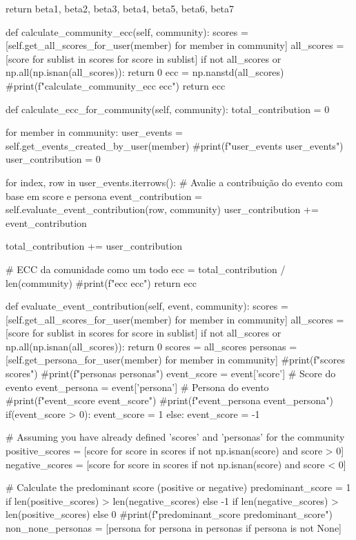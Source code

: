 \begin{codigo}[caption={Exemplo de classe Python para deteção de câmaras de eco}, label={codigo:echochamberdetector}, language=Python, breaklines=true]
        return beta1, beta2, beta3, beta4, beta5, beta6, beta7

    def calculate_community_ecc(self, community):
        scores = [self.get_all_scores_for_user(member) for member in community]
        all_scores = [score for sublist in scores for score in sublist]
        if not all_scores or np.all(np.isnan(all_scores)):
            return 0
        ecc = np.nanstd(all_scores)
        #print(f"calculate_community_ecc {ecc}")
        return ecc

    def calculate_ecc_for_community(self, community):
        total_contribution = 0

        for member in community:
            user_events = self.get_events_created_by_user(member)
            #print(f"user_events {user_events}")
            user_contribution = 0

            for index, row in user_events.iterrows():
                # Avalie a contribuição do evento com base em score e persona
                event_contribution = self.evaluate_event_contribution(row, community)
                user_contribution += event_contribution

            total_contribution += user_contribution

        # ECC da comunidade como um todo
        ecc = total_contribution / len(community)
        #print(f"ecc {ecc}")
        return ecc

    def evaluate_event_contribution(self, event, community):
        scores = [self.get_all_scores_for_user(member) for member in community]
        all_scores = [score for sublist in scores for score in sublist]
        if not all_scores or np.all(np.isnan(all_scores)):
            return 0
        scores = all_scores
        personas = [self.get_persona_for_user(member) for member in community]
        #print(f"scores {scores}")
        #print(f"personas {personas}")
        event_score = event['score']  # Score do evento
        event_persona = event['persona']  # Persona do evento
        #print(f"event_score {event_score}")
        #print(f"event_persona {event_persona}")
        if(event_score > 0): event_score = 1
        else: event_score = -1

        # Assuming you have already defined 'scores' and 'personas' for the community
        positive_scores = [score for score in scores if not np.isnan(score) and score > 0]
        negative_scores = [score for score in scores if not np.isnan(score) and score < 0]

        # Calculate the predominant score (positive or negative)
        predominant_score = 1 if len(positive_scores) > len(negative_scores) else -1 if len(negative_scores) > len(positive_scores) else 0
        #print(f"predominant_score {predominant_score}")
        non_none_personas = [persona for persona in personas if persona is not None]


\end{codigo}
